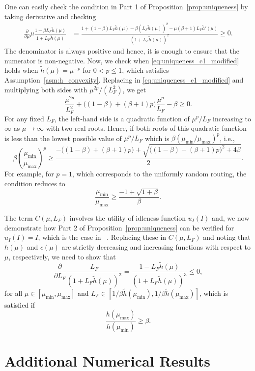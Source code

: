 \documentclass[a4paper,11pt,twoside]{article}
\numberwithin{equation}{section}
\numberwithin{figure}{section}
\theoremstyle{plain}
\newcommand{\1}{\mathbbm{1}}
\begin{document}
One can easily check the condition in Part 1 of Proposition~\ref{prop:uniqueness} by taking derivative and checking
\begin{align}
    \frac{\partial}{\partial \mu}\mu\frac{1-\beta L_F\tilde{h}(\mu)}{1+L_F\tilde{h}(\mu)} &= \frac{ 1 + (1 - \beta) L_F \tilde{h}(\mu) - \beta (L_F \tilde{h}(\mu))^2 - \mu (\beta + 1) L_F \tilde{h}'(\mu)
}{(1+L_F\tilde{h}(\mu))^2} \geq 0.
\label{eq:uniqueness_c1_modified}
\end{align}
The denominator is always positive and hence, it is enough to ensure that the numerator is non-negative. Now, we check when \eqref{eq:uniqueness_c1_modified} holds when $\tilde{h}(\mu)=\mu^{-p}$ for $0<p\leq 1$, which satisfies Assumption~\ref{asm:h_convexity}. Replacing in \eqref{eq:uniqueness_c1_modified} and multiplying both sides with $\mu^{2p}/(L_F^2)$, we get 
\[
 \frac{\mu^{2p}}{L_F^2} + \Big( (1 - \beta) + (\beta + 1)p \Big) \frac{\mu^p}{L_F} - \beta \geq 0.
\]
For any fixed $L_F$, the left-hand side is a quadratic function of $\mu^p/L_F$ increasing to $\infty$ as $\mu\to\infty$ with two real roots. Hence, if both roots of this quadratic function is less than the lowest possible value of $\mu^p/L_F$ which is $\beta(\mu_{\min}/\mu_{\max})^p$, i.e.,
\[
 \beta\left(\frac{\mu_{\min}}{\mu_{\max}}\right)^p \geq  \frac{- \Big( (1 - \beta) + (\beta + 1)p \Big) + \sqrt{\Big( (1 - \beta) + (\beta + 1)p \Big)^2 + 4\beta}}{2}.
\]
For example, for $p=1$, which corresponds to the uniformly random routing, the condition reduces to 
\[
\frac{\mu_{\min}}{\mu_{\max}}\geq \frac{-1 + \sqrt{1+\beta}}{\beta}.
\]

The term $C(\mu,L_F)$ involves the utility of idleness function $u_I(I)$ and, we now demonstrate how Part 2 of Proposition~\ref{prop:uniqueness} can be verified for $u_I(I) = I$, which is the case in ~\cite{Gopalakrishnan_etal2016}. Replacing these in $C(\mu,L_F)$ and noting that $\tilde{h}(\mu)$ and $c(\mu)$ are strictly decreasing and increasing functions with respect to $\mu$, respectively, we need to show that 
\[
\frac{\partial}{\partial L_F}\frac{L_F}{(1 + L_F \tilde{h}(\mu))^2} = \frac{1 - L_F \tilde{h}(\mu)}{(1 + L_F \tilde{h}(\mu))^3}\leq 0,
\]
for all $\mu\in[\mu_{\min}, \mu_{\max}]$ and $L_F\in[1/\beta \tilde{h}(\mu_{\min}), 1/\beta \tilde{h}(\mu_{\max})]$, which is satisfied if
\[
\frac{h(\mu_{\max})}{h(\mu_{\min})}\geq \beta.
\]





\section{Additional Numerical Results}\label{sec:additional_numerics}
\end{document}
